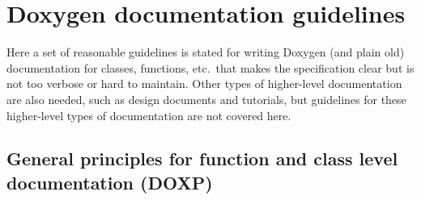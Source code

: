 %
\section{Doxygen documentation guidelines}
\label{sec:DocumentionGuidelines}
%

Here a set of reasonable guidelines is stated for writing Doxygen (and plain
old) documentation for classes, functions, etc.\ that makes the specification
clear but is not too verbose or hard to maintain.  Other types of higher-level
documentation are also needed, such as design documents and tutorials, but
guidelines for these higher-level types of documentation are not covered here.

%
\subsection{General principles for function and class level documentation (DOXP)}
%

